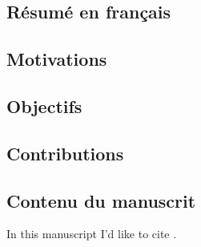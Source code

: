 \begin{bibunit}

\chapter*{Résumé en français}

\section*{Motivations}

\section*{Objectifs}

\section*{Contributions}

\section*{Contenu du manuscrit}

In this manuscript I'd like to cite \cite{remo1,remo2}.

\end{bibunit}